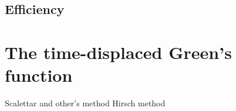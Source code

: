 \documentclass[%
 reprint,
superscriptaddress,
showpacs,
 amsmath,amssymb,
 aps,
 prb,
longbibliography,
]{revtex4-1}
\begin{document}
%		
%		
%		
%		
%		
%		
%		



\subsection{Efficiency}


\clearpage
\section{The time-displaced Green's function}
Scalettar and other's method \cite{Loh2005}
Hirsch method\cite{Hirsch1988}








\clearpage

\end{document}
